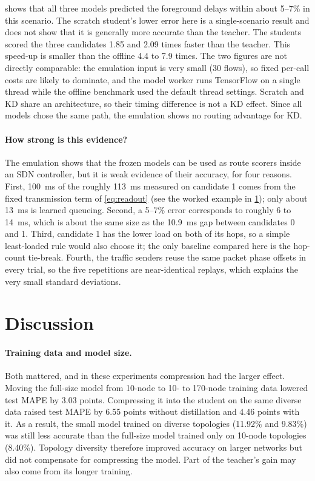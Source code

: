  shows that all three models predicted the foreground delays within about 5--7\% in this scenario. The scratch student's lower error here is a single-scenario result and does not show that it is generally more accurate than the teacher. The students scored the three candidates 1.85 and 2.09 times faster than the teacher. This speed-up is smaller than the offline 4.4 to 7.9 times. The two figures are not directly comparable: the emulation input is very small (30 flows), so fixed per-call costs are likely to dominate, and the model worker runs TensorFlow on a single thread while the offline benchmark used the default thread settings. Scratch and KD share an architecture, so their timing difference is not a KD effect. Since all models chose the same path, the emulation shows no routing advantage for KD.

\paragraph{How strong is this evidence?} The emulation shows that the frozen models can be used as route scorers inside an SDN controller, but it is weak evidence of their accuracy, for four reasons. First, 100~ms of the roughly 113~ms measured on candidate 1 comes from the fixed transmission term of \cref{eq:readout} (see the worked example in \cref{sec:discussion}); only about 13~ms is learned queueing. Second, a 5--7\% error corresponds to roughly 6 to 14~ms, which is about the same size as the 10.9~ms gap between candidates 0 and 1. Third, candidate 1 has the lower load on both of its hops, so a simple least-loaded rule would also choose it; the only baseline compared here is the hop-count tie-break. Fourth, the traffic senders reuse the same packet phase offsets in every trial, so the five repetitions are near-identical replays, which explains the very small standard deviations.

\section{Discussion}
\label{sec:discussion}

\paragraph{Training data and model size.} Both mattered, and in these experiments compression had the larger effect. Moving the full-size model from 10-node to 10- to 170-node training data lowered test MAPE by 3.03 points. Compressing it into the student on the same diverse data raised test MAPE by 6.55 points without distillation and 4.46 points with it. As a result, the small model trained on diverse topologies (11.92\% and 9.83\%) was still less accurate than the full-size model trained only on 10-node topologies (8.40\%). Topology diversity therefore improved accuracy on larger networks but did not compensate for compressing the model. Part of the teacher's gain may also come from its longer training.

